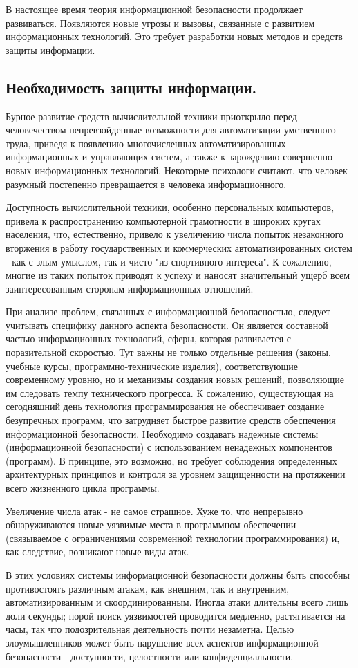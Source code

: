 В настоящее время теория информационной безопасности продолжает развиваться. Появляются новые угрозы и вызовы, связанные с 
развитием информационных технологий. Это требует разработки новых методов и средств защиты информации.

\newpage
\subsection{Необходимость защиты информации.}
Бурное развитие средств вычислительной техники приоткрыло перед человечеством непревзойденные возможности для автоматизации 
умственного труда, приведя к появлению многочисленных автоматизированных информационных и управляющих систем, а также к 
зарождению совершенно новых информационных технологий. Некоторые психологи считают, что человек разумный постепенно 
превращается в человека информационного.

Доступность вычислительной техники, особенно персональных компьютеров, привела к распространению компьютерной грамотности в 
широких кругах населения, что, естественно, привело к увеличению числа попыток незаконного вторжения в работу государственных 
и коммерческих автоматизированных систем - как с злым умыслом, так и чисто "из спортивного интереса". К сожалению, многие из 
таких попыток приводят к успеху и наносят значительный ущерб всем заинтересованным сторонам информационных отношений.

При анализе проблем, связанных с информационной безопасностью, следует учитывать специфику данного аспекта безопасности. Он 
является составной частью информационных технологий, сферы, которая развивается с поразительной скоростью. Тут важны не 
только отдельные решения (законы, учебные курсы, программно-технические изделия), соответствующие современному уровню, но и 
механизмы создания новых решений, позволяющие им следовать темпу технического прогресса. К сожалению, существующая на 
сегодняшний день технология программирования не обеспечивает создание безупречных программ, что затрудняет быстрое развитие 
средств обеспечения информационной безопасности. Необходимо создавать надежные системы (информационной безопасности) с 
использованием ненадежных компонентов (программ). В принципе, это возможно, но требует соблюдения определенных архитектурных 
принципов и контроля за уровнем защищенности на протяжении всего жизненного цикла программы.

Увеличение числа атак - не самое страшное. Хуже то, что непрерывно обнаруживаются новые уязвимые места в программном 
обеспечении (связываемое с ограничениями современной технологии программирования) и, как следствие, возникают новые виды атак.

В этих условиях системы информационной безопасности должны быть способны противостоять различным атакам, как внешним, так и 
внутренним, автоматизированным и скоординированным. Иногда атаки длительны всего лишь доли секунды; порой поиск уязвимостей 
проводится медленно, растягивается на часы, так что подозрительная деятельность почти незаметна. Целью злоумышленников может 
быть нарушение всех аспектов информационной безопасности - доступности, целостности или конфиденциальности.
